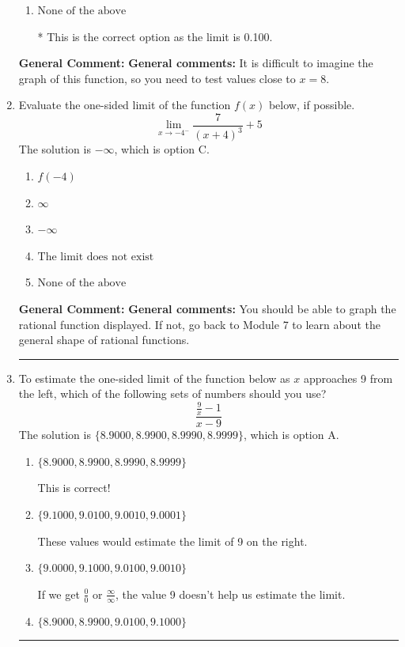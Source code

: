 \documentclass{extbook}[14pt]
\newcommand{\litem}[1]{\item #1

\rule{\textwidth}{0.4pt}}
\begin{document}
\begin{enumerate}
{\begin{enumerate}[label=\Alph*.]
You likely memorized how to solve the similar homework problem and used the same formula here.
\item \( \text{None of the above} \)

* This is the correct option as the limit is 0.100.
\end{enumerate}

\textbf{General Comment:} \textbf{General comments:} It is difficult to imagine the graph of this function, so you need to test values close to $x = 8$.
}
\litem{
Evaluate the one-sided limit of the function $f(x)$ below, if possible.
\[ \lim_{x \rightarrow -4^-} \frac{7}{(x+4)^3}+5 \]The solution is \( -\infty \), which is option C.\begin{enumerate}[label=\Alph*.]
\item \( f(-4) \)


\item \( \infty \)


\item \( -\infty \)


\item \( \text{The limit does not exist} \)


\item \( \text{None of the above} \)


\end{enumerate}

\textbf{General Comment:} \textbf{General comments:} You should be able to graph the rational function displayed. If not, go back to Module 7 to learn about the general shape of rational functions.
}
\litem{
To estimate the one-sided limit of the function below as $x$ approaches 9 from the left, which of the following sets of numbers should you use?
\[ \frac{\frac{9}{x} - 1}{x - 9} \]The solution is \( \{ 8.9000, 8.9900, 8.9990, 8.9999 \} \), which is option A.\begin{enumerate}[label=\Alph*.]
\item \( \{ 8.9000, 8.9900, 8.9990, 8.9999 \} \)

This is correct!
\item \( \{ 9.1000, 9.0100, 9.0010, 9.0001 \} \)

These values would estimate the limit of 9 on the right.
\item \( \{ 9.0000, 9.1000, 9.0100, 9.0010 \} \)

If we get $\frac{0}{0}$ or $\frac{\infty}{\infty}$, the value 9 doesn't help us estimate the limit.
\item \( \{ 8.9000, 8.9900, 9.0100, 9.1000 \} \)


\end{enumerate}}
\end{enumerate}
\end{document}

